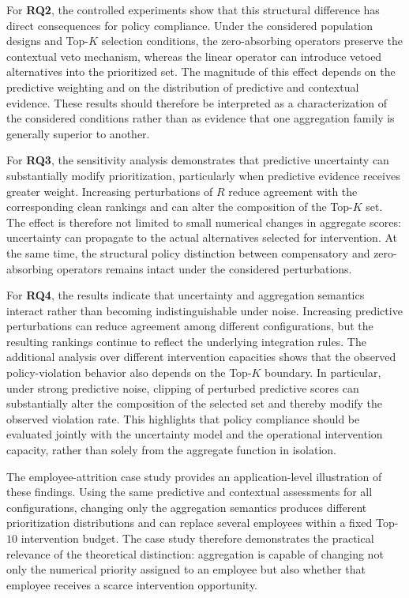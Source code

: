 \documentclass[mathematics,article,submit,moreauthors]{Definitions/mdpi}
\begin{document}
For \textbf{RQ2}, the controlled experiments show that this structural
difference has direct consequences for policy compliance. Under the
considered population designs and Top-$K$ selection conditions, the
zero-absorbing operators preserve the contextual veto mechanism, whereas
the linear operator can introduce vetoed alternatives into the prioritized
set. The magnitude of this effect depends on the predictive weighting and
on the distribution of predictive and contextual evidence. These results
should therefore be interpreted as a characterization of the considered
conditions rather than as evidence that one aggregation family is generally
superior to another.

For \textbf{RQ3}, the sensitivity analysis demonstrates that predictive
uncertainty can substantially modify prioritization, particularly when
predictive evidence receives greater weight. Increasing perturbations of
$R$ reduce agreement with the corresponding clean rankings and can alter the
composition of the Top-$K$ set. The effect is therefore not limited to
small numerical changes in aggregate scores: uncertainty can propagate to
the actual alternatives selected for intervention. At the same time, the
structural policy distinction between compensatory and zero-absorbing
operators remains intact under the considered perturbations.

For \textbf{RQ4}, the results indicate that uncertainty and aggregation
semantics interact rather than becoming indistinguishable under noise.
Increasing predictive perturbations can reduce agreement among different
configurations, but the resulting rankings continue to reflect the
underlying integration rules. The additional analysis over different
intervention capacities shows that the observed policy-violation behavior
also depends on the Top-$K$ boundary. In particular, under strong predictive
noise, clipping of perturbed predictive scores can substantially alter the
composition of the selected set and thereby modify the observed violation
rate. This highlights that policy compliance should be evaluated jointly
with the uncertainty model and the operational intervention capacity,
rather than solely from the aggregate function in isolation.

The employee-attrition case study provides an application-level
illustration of these findings. Using the same predictive and contextual
assessments for all configurations, changing only the aggregation semantics
produces different prioritization distributions and can replace several
employees within a fixed Top-$10$ intervention budget. The case study
therefore demonstrates the practical relevance of the theoretical
distinction: aggregation is capable of changing not only the numerical
priority assigned to an employee but also whether that employee receives a
scarce intervention opportunity.
\end{document}
